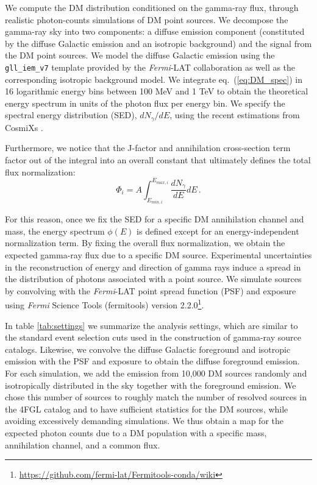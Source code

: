 \documentclass[12pt, a4paper]{article}
\newcommand{\Fermi}{{\sl Fermi}}
\begin{document}
We compute the DM distribution  conditioned on the gamma-ray flux, through realistic photon-counts simulations of DM point sources. 
We decompose the gamma-ray sky into two  components: a diffuse emission component (constituted by the diffuse Galactic emission and an isotropic background) and the signal from the DM point sources. 
We model the diffuse Galactic emission using the \verb|gll_iem_v7| template provided by the \Fermi-LAT collaboration as well as the corresponding isotropic background model.
We integrate eq.~(\ref{eq:DM_spec}) in 16 logarithmic energy bins between 100 MeV and 1 TeV to obtain the theoretical energy spectrum in units of the photon flux per energy bin.
We specify the spectral energy distribution (SED), $dN_\gamma/dE$, using the recent estimations from CosmiXs \cite{2024JCAP...03..035A}.

Furthermore, we notice that the J-factor and annihilation cross-section term factor out of the integral into an overall constant that ultimately defines the total flux normalization: 
\begin{equation}
   \Phi_i = A \int_{E_{min, i}}^{E_{max,i} }\frac{dN_\gamma}{dE}dE \,.
\end{equation}

For this reason, once we fix the SED for a specific DM annihilation channel and mass, the energy spectrum $\phi(E)$ is defined except for an energy-independent normalization term. 
By fixing the overall flux normalization, we obtain the expected gamma-ray flux due to a specific DM source. 
Experimental uncertainties in the reconstruction of energy and direction of gamma rays induce a spread in the distribution of photons associated with a point source.
We simulate sources by convolving with the \Fermi-LAT point spread function (PSF) and exposure
using {\Fermi} Science Tools (fermitools) version 2.2.0\footnote{\url{https://github.com/fermi-lat/Fermitools-conda/wiki}}.

In table \ref{tab:settings} we summarize the analysis settings, which are similar to the standard event selection cuts used in the construction of gamma-ray source catalogs. 
Likewise, we convolve the diffuse Galactic foreground and isotropic emission with the PSF and exposure to obtain the diffuse foreground emission.
For each simulation, we add the emission from 10,000 DM sources randomly and isotropically distributed in the sky together with the foreground emission. We chose this number of sources to roughly match the number of resolved sources in the 4FGL catalog and to have sufficient statistics for the DM sources, while avoiding excessively demanding simulations. We thus obtain a map for the expected photon counts due to a DM population with a specific mass, annihilation channel, and a common flux.
\end{document}
